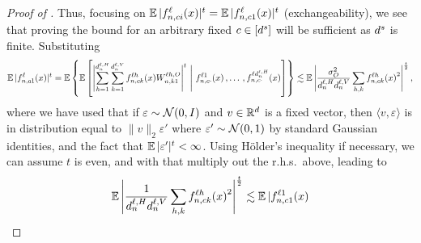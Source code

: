 \begin{proof}[Proof of ]
    Thus, focusing on 
    $
        \operatorname*{\mathbb{E}} | 
            {f}^{\ell}_{n, c i}{(x)} 
        |^t
        =
        \operatorname*{\mathbb{E}} | 
            {f}^{\ell}_{n, c 1}{(x)} 
        |^t
    $ (exchangeability),
    we see that proving the bound for an arbitrary fixed $c \in [d^s]$ will be sufficient as $d^s$ is finite.
    Substituting
    \begin{align*}
        \operatorname*{\mathbb{E}} | 
            {f}^{\ell}_{n, c 1}{(x)} 
        |^t
        =
        \operatorname*{\mathbb{E}} \left\{
            \operatorname*{\mathbb{E}} \left[
                \Biggl|
                        \sum_{h=1}^{d_{n}^{\ell, H}}
                        \sum_{k=1}^{d_{n}^{\ell, V}}
                            {f}^{\ell h}_{n, c k}{(x)}
                            W_{n, k 1}^{\ell h , O}
                    \Biggr|^t
                    \, \, 
                    \Bigg\vert
                    \, \,
                    {f}^{\ell 1}_{n, c \cdot }{(x)}
                    \, , \ldots \, ,
                    {f}^{\ell d_{n}^{\ell, H}}_{n, c \cdot }{(x)}
            \right]
        \right\}
        \lesssim
        \operatorname*{\mathbb{E}} \, \Biggl|
            \frac{\sigma_{O}^2}{d_{n}^{\ell, H} d_{n}^{\ell, V}}
            \sum_{h , k}
                {f}^{\ell h}_{n, c k }{(x)}^2
        \Biggr|^{\frac{t}{2}}
        \, ,
    \end{align*}
    where we have used that if $\varepsilon \sim \mathcal{N}( 0, I)$ and $v \in \mathbb{R}^{d}$ is a fixed vector, then $\langle v , \varepsilon \rangle$ is in distribution equal to $\| v \|_2 \varepsilon'$ where $\varepsilon' \sim \mathcal{N}(0, 1)$ by standard Gaussian identities, and the fact that $\operatorname*{\mathbb{E}} | \varepsilon' |^t < \infty$.
    Using H{\" o}lder's inequality if necessary, we can assume $t$ is even, and with that multiply out the r.h.s.\ above, leading to 
    \begin{align*}
        \E \, \Biggl|
            \frac{1}{\headDimension \valueDimension}
            \sum_{h , k}
                \indexedActivation{\depthSymbol\headIndex}{\sequenceVariable, c k }{\inputSymbol}^2
        \Biggr|^{\frac{t}{2}}
        \lesssim
        \E |
            \indexedActivation{\depthSymbol 1}{\sequenceVariable, c 1 }{\inputSymbol}

\end{align*}
\end{proof}
